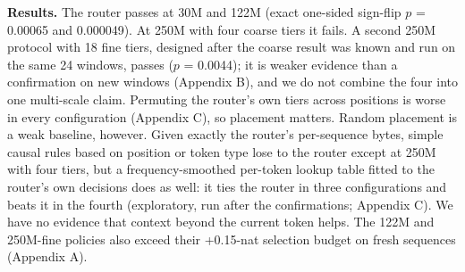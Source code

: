 \documentclass[10pt]{article}
\begin{document}
\begin{table}[t]
\centering
\caption{Pre-registered fresh-window confirmations of the router against exact-byte random placement, 24 sequences per configuration. Wins count sequences on which the router has the lower loss.}
\end{table}

\textbf{Results.} The router passes at 30M and 122M (exact one-sided sign-flip $p$ = 0.00065 and 0.000049). At 250M with four coarse tiers it fails. A second 250M protocol with 18 fine tiers, designed after the coarse result was known and run on the same 24 windows, passes ($p$ = 0.0044); it is weaker evidence than a confirmation on new windows (Appendix B), and we do not combine the four into one multi-scale claim. Permuting the router's own tiers across positions is worse in every configuration (Appendix C), so placement matters. Random placement is a weak baseline, however. Given exactly the router's per-sequence bytes, simple causal rules based on position or token type lose to the router except at 250M with four tiers, but a frequency-smoothed per-token lookup table fitted to the router's own decisions does as well: it ties the router in three configurations and beats it in the fourth (exploratory, run after the confirmations; Appendix C). We have no evidence that context beyond the current token helps. The 122M and 250M-fine policies also exceed their +0.15-nat selection budget on fresh sequences (Appendix A).
\end{document}
